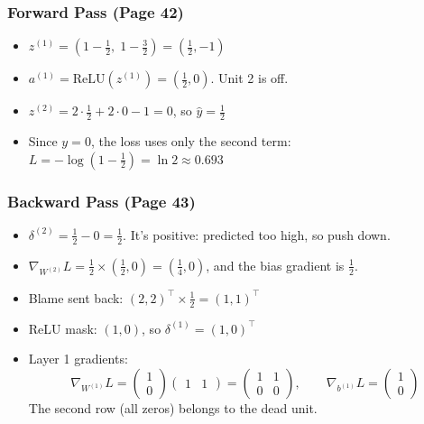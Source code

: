 \subsubsection*{Forward Pass (Page 42)}
\begin{itemize}[leftmargin=*]
  \item $z^{(1)} = (1 - \tfrac12,\; 1 - \tfrac32) = (\tfrac12, -1)$
  \item $a^{(1)} = \mathrm{ReLU}(z^{(1)}) = (\tfrac12, 0)$. Unit 2 is off.
  \item $z^{(2)} = 2\cdot\tfrac12 + 2\cdot0 - 1 = 0$, so $\hat{y} = \tfrac12$
  \item Since $y = 0$, the loss uses only the second term: $L = -\log(1 - \tfrac12) = \ln 2 \approx 0.693$
\end{itemize}

\subsubsection*{Backward Pass (Page 43)}
\begin{itemize}[leftmargin=*]
  \item $\delta^{(2)} = \tfrac12 - 0 = \tfrac12$. It's positive: predicted too high, so push down.
  \item $\nabla_{W^{(2)}} L = \tfrac12 \times (\tfrac12, 0) = (\tfrac14, 0)$, and the bias gradient is $\tfrac12$.
  \item Blame sent back: $(2, 2)^{\top} \times \tfrac12 = (1, 1)^{\top}$
  \item ReLU mask: $(1, 0)$, so $\delta^{(1)} = (1, 0)^{\top}$
  \item Layer 1 gradients:
  \[
  \nabla_{W^{(1)}} L = \begin{pmatrix} 1 \\ 0 \end{pmatrix} \begin{pmatrix} 1 & 1 \end{pmatrix} = \begin{pmatrix} 1 & 1 \\ 0 & 0 \end{pmatrix}, \qquad \nabla_{b^{(1)}} L = \begin{pmatrix} 1 \\ 0 \end{pmatrix}
  \]
  The second row (all zeros) belongs to the dead unit.
\end{itemize}

